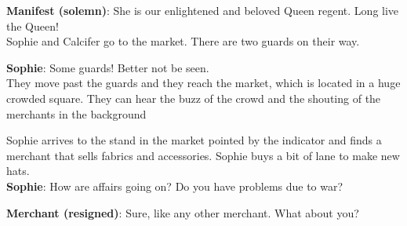 \textbf{Manifest (solemn)}: She is our enlightened and beloved Queen regent. Long live the Queen!\\

\noindent Sophie and Calcifer go to the market. There are two guards on their way.

\textbf{Sophie}: Some guards! Better not be seen.\\

\noindent They move past the guards and they reach the market, which is located in a huge crowded square.
They can hear the buzz of the crowd and the shouting of the merchants in the background


\noindent Sophie arrives to the stand in the market pointed by the indicator and finds a merchant that sells fabrics and accessories.
Sophie buys a bit of lane to make new hats.\\

\textbf{Sophie}: How are affairs going on? Do you have problems due to war?

\textbf{Merchant (resigned)}: Sure, like any other merchant. What about you?\\

